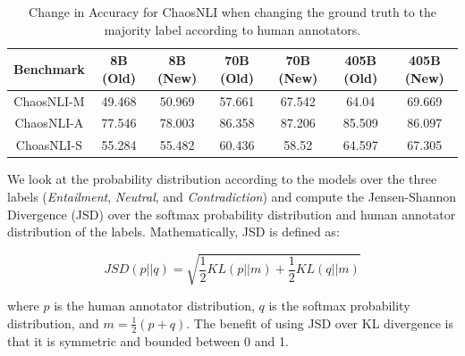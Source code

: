 \begin{table}
    \centering
    \begin{tabular}{c|cc|cc|cc}
    \textbf{Benchmark} & \textbf{8B (Old)} & \textbf{8B (New)} & \textbf{70B (Old)} & \textbf{70B (New)} & \textbf{405B (Old)} & \textbf{405B (New)} \\
    \hline
    ChaosNLI-M & 49.468 & 50.969 & 57.661 & 67.542 & 64.04 & 69.669 \\
    ChaosNLI-A & 77.546 & 78.003 & 86.358 & 87.206 & 85.509 & 86.097 \\
    ChoasNLI-S & 55.284 & 55.482 & 60.436 & 58.52 & 64.597 & 67.305 \\
    \end{tabular}
\caption{Change in Accuracy for ChaosNLI when changing the ground truth to the majority label according to human annotators.}
\label{tab:chaos_acc}
\end{table}

We look at the probability distribution according to the models over the three labels (\textit{Entailment}, \textit{Neutral}, and \textit{Contradiction}) and compute the Jensen-Shannon Divergence (JSD) \citep{menendez1997jensen} over the softmax probability distribution and human annotator distribution of the labels. Mathematically, JSD is defined as:

\[
    JSD(p || q) = \sqrt{\frac{1}{2}KL(p || m) + \frac{1}{2}KL(q || m)}
\]

where $p$ is the human annotator distribution, $q$ is the softmax probability distribution, and $m = \frac{1}{2}(p + q)$. The benefit of using JSD over KL divergence is that it is symmetric and bounded between 0 and 1.

